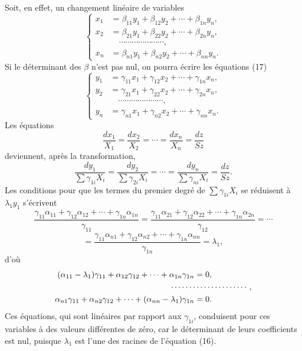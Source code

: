 \documentclass[11pt]{article}
\begin{document}
Soit, en effet, un changement linéaire de variables
\begin{equation*}\tag{17}
\left\{
\begin{aligned}
x_1&=\beta_{11}y_1+\beta_{12}y_2+\cdots+\beta_{1n}y_n,\\
x_2&=\beta_{21}y_1+\beta_{22}y_2+\cdots+\beta_{2n}y_n,\\
&\hspace{1em}\cdots\cdots\cdots\cdots\cdots\cdots\cdots,\\
x_n&=\beta_{n1}y_1+\beta_{n2}y_2+\cdots+\beta_{nn}y_n.
\end{aligned}
\right.
\end{equation*}
Si le déterminant des $\beta$ n’est pas nul, on pourra écrire les équations (17)
\begin{equation*}\tag{18}
\left\{
\begin{aligned}
y_1&=\gamma_{11}x_1+\gamma_{12}x_2+\cdots+\gamma_{1n}x_n,\\
y_2&=\gamma_{21}x_1+\gamma_{22}x_2+\cdots+\gamma_{2n}x_n,\\
&\hspace{1em}\cdots\cdots\cdots\cdots\cdots\cdots\cdots,\\
y_n&=\gamma_{n1}x_1+\gamma_{n2}x_2+\cdots+\gamma_{nn}x_n.
\end{aligned}
\right.
\end{equation*}
Les équations
\[
\frac{dx_1}{X_1}=\frac{dx_2}{X_2}=\cdots=\frac{dx_n}{X_n}=\frac{dz}{Sz}
\]
deviennent, après la transformation,
\begin{equation*}\tag{19}
\frac{dy_1}{\sum \gamma_{1i}X_i}
=\frac{dy_2}{\sum \gamma_{2i}X_i}
=\cdots=
\frac{dy_n}{\sum \gamma_{ni}X_i}
=\frac{dz}{Sz}.
\end{equation*}
Les conditions pour que les termes du premier degré de $\sum\gamma_{1i}X_i$ se réduisent à $\lambda_1y_1$ s’écrivent
\[
\frac{\gamma_{11}\alpha_{11}+\gamma_{12}\alpha_{12}+\cdots+\gamma_{1n}\alpha_{1n}}{\gamma_{11}}
=
\frac{\gamma_{11}\alpha_{21}+\gamma_{12}\alpha_{22}+\cdots+\gamma_{1n}\alpha_{2n}}{\gamma_{12}}
=\cdots
\]
\[
=\frac{\gamma_{11}\alpha_{n1}+\gamma_{12}\alpha_{n2}+\cdots+\gamma_{1n}\alpha_{nn}}{\gamma_{1n}}
=\lambda_1,
\]
d’où
\[
\begin{aligned}
(\alpha_{11}-\lambda_1)\gamma_{11}+\alpha_{12}\gamma_{12}+\cdots+\alpha_{1n}\gamma_{1n}&=0,\\
&\hspace{-3em}\cdots\cdots\cdots\cdots\cdots\cdots\cdots,\\
\alpha_{n1}\gamma_{11}+\alpha_{n2}\gamma_{12}+\cdots+(\alpha_{nn}-\lambda_1)\gamma_{1n}&=0.
\end{aligned}
\]
Ces équations, qui sont linéaires par rapport aux $\gamma_{1i}$, conduisent pour ces variables à des valeurs différentes de zéro, car le déterminant de leurs coefficients est nul, puisque $\lambda_1$ est l’une des racines de l’équation (16).
\end{document}

